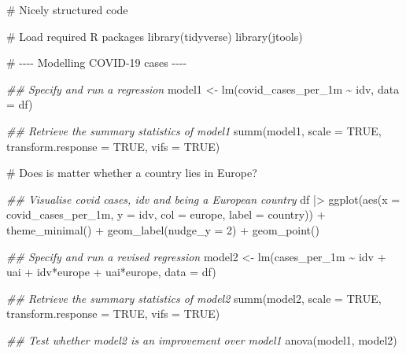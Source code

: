 \documentclass[
  letterpaper,
]{krantz}
\makeatletter
\newenvironment{Shaded}{\begin{snugshade}}{\end{snugshade}}
\newcommand{\AttributeTok}[1]{\textcolor[rgb]{0.40,0.45,0.13}{#1}}
\newcommand{\CommentTok}[1]{\textcolor[rgb]{0.37,0.37,0.37}{#1}}
\newcommand{\ConstantTok}[1]{\textcolor[rgb]{0.56,0.35,0.01}{#1}}
\newcommand{\DecValTok}[1]{\textcolor[rgb]{0.68,0.00,0.00}{#1}}
\newcommand{\DocumentationTok}[1]{\textcolor[rgb]{0.37,0.37,0.37}{\textit{#1}}}
\newcommand{\FunctionTok}[1]{\textcolor[rgb]{0.28,0.35,0.67}{#1}}
\newcommand{\NormalTok}[1]{\textcolor[rgb]{0.00,0.23,0.31}{#1}}
\newcommand{\OtherTok}[1]{\textcolor[rgb]{0.00,0.23,0.31}{#1}}
\newcommand{\SpecialCharTok}[1]{\textcolor[rgb]{0.37,0.37,0.37}{#1}}
\newenvironment{kframe}{%
\medskip{}
\setlength{\fboxsep}{.8em}
 \def\at@end@of@kframe{}%
 \ifinner\ifhmode%
  \def\at@end@of@kframe{\end{minipage}}%
  \begin{minipage}{\columnwidth}%
 \fi\fi%
 \def\FrameCommand##1{\hskip\@totalleftmargin \hskip-\fboxsep
 \colorbox{shadecolor}{##1}\hskip-\fboxsep
     \hskip-\linewidth \hskip-\@totalleftmargin \hskip\columnwidth}%
 \MakeFramed {\advance\hsize-\width
   \@totalleftmargin\z@ \linewidth\hsize
   \@setminipage}}%
 {\par\unskip\endMakeFramed%
 \at@end@of@kframe}
\renewenvironment{Shaded}{\begin{kframe}}{\end{kframe}}
\makeatother
\begin{document}
\begin{Shaded}
\begin{Highlighting}[]
\CommentTok{\# Nicely structured code}

\CommentTok{\# Load required R packages}
\FunctionTok{library}\NormalTok{(tidyverse)}
\FunctionTok{library}\NormalTok{(jtools)}

\CommentTok{\# {-}{-}{-}{-} Modelling COVID{-}19 cases {-}{-}{-}{-}}

\DocumentationTok{\#\# Specify and run a regression}
\NormalTok{model1 }\OtherTok{\textless{}{-}} \FunctionTok{lm}\NormalTok{(covid\_cases\_per\_1m }\SpecialCharTok{\textasciitilde{}}\NormalTok{ idv, }\AttributeTok{data =}\NormalTok{ df)}

\DocumentationTok{\#\# Retrieve the summary statistics of model1}
\FunctionTok{summ}\NormalTok{(model1,}
     \AttributeTok{scale =} \ConstantTok{TRUE}\NormalTok{,}
     \AttributeTok{transform.response =} \ConstantTok{TRUE}\NormalTok{,}
     \AttributeTok{vifs =} \ConstantTok{TRUE}\NormalTok{)}

\CommentTok{\# Does is matter whether a country lies in Europe?}

\DocumentationTok{\#\# Visualise covid cases, idv and being a European country}
\NormalTok{df }\SpecialCharTok{|\textgreater{}}
  \FunctionTok{ggplot}\NormalTok{(}\FunctionTok{aes}\NormalTok{(}\AttributeTok{x =}\NormalTok{ covid\_cases\_per\_1m,}
             \AttributeTok{y =}\NormalTok{ idv,}
             \AttributeTok{col =}\NormalTok{ europe,}
             \AttributeTok{label =}\NormalTok{ country)) }\SpecialCharTok{+}
  \FunctionTok{theme\_minimal}\NormalTok{() }\SpecialCharTok{+}
  \FunctionTok{geom\_label}\NormalTok{(}\AttributeTok{nudge\_y =} \DecValTok{2}\NormalTok{) }\SpecialCharTok{+}
  \FunctionTok{geom\_point}\NormalTok{()}

\DocumentationTok{\#\# Specify and run a revised regression}
\NormalTok{model2 }\OtherTok{\textless{}{-}} \FunctionTok{lm}\NormalTok{(cases\_per\_1m }\SpecialCharTok{\textasciitilde{}}\NormalTok{ idv }\SpecialCharTok{+}\NormalTok{ uai }\SpecialCharTok{+}\NormalTok{ idv}\SpecialCharTok{*}\NormalTok{europe }\SpecialCharTok{+}\NormalTok{ uai}\SpecialCharTok{*}\NormalTok{europe,}
                 \AttributeTok{data =}\NormalTok{ df)}

\DocumentationTok{\#\# Retrieve the summary statistics of model2}
\FunctionTok{summ}\NormalTok{(model2,}
     \AttributeTok{scale =} \ConstantTok{TRUE}\NormalTok{,}
     \AttributeTok{transform.response =} \ConstantTok{TRUE}\NormalTok{,}
     \AttributeTok{vifs =} \ConstantTok{TRUE}\NormalTok{)}

\DocumentationTok{\#\# Test whether model2 is an improvement over model1}
\FunctionTok{anova}\NormalTok{(model1, model2)}
\end{Highlighting}
\end{Shaded}
\end{document}
